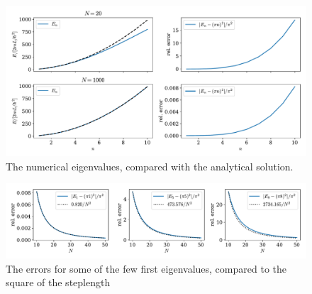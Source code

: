 \documentclass{article}
\begin{document}
    \begin{figure}[h]
        \centering
        \includegraphics[width=\textwidth]{particle_in_box/values}
        \caption{The numerical eigenvalues, compared with the analytical solution.}
        \label{eigenvalues}
    \end{figure}

    \begin{figure}[h]
        \centering
        \includegraphics[width = \textwidth]{particle_in_box/error}
        \caption{The errors for some of the few first eigenvalues, compared to the square of the steplength}
        \label{errors}
    \end{figure}
\end{document}
